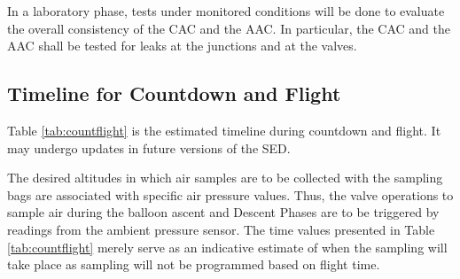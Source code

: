 \documentclass[a4paper,12pt,twoside]{article}
\begin{document}
In a laboratory phase, tests under monitored conditions will be done to evaluate the overall consistency of the CAC and the AAC. In particular, the CAC and the AAC shall be tested for leaks at the junctions and at the valves. 

\pagebreak
\subsection{Timeline for Countdown and Flight}
Table \ref{tab:countflight} is the estimated timeline during countdown and flight. It may undergo updates in future versions of the SED.

The desired altitudes in which air samples are to be collected with the sampling bags are associated with specific air pressure values. Thus, the valve operations to sample air during the balloon ascent and Descent Phases are to be triggered by readings from the ambient pressure sensor. The time values presented in Table \ref{tab:countflight} merely serve as an indicative estimate of when the sampling will take place as sampling will not be programmed based on flight time.
\end{document}
